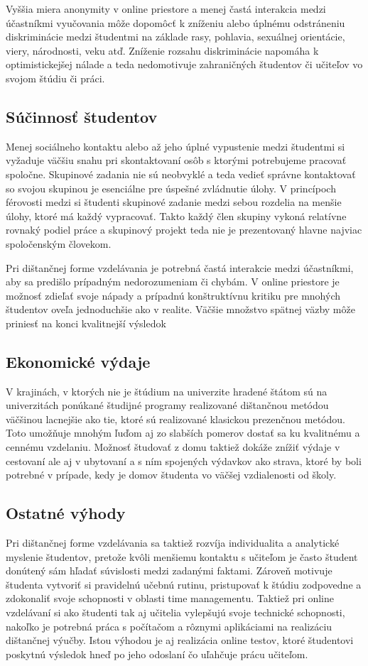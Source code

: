 \documentclass[10pt,twoside,slovak,a4paper]{article}
\begin{document}
 	Vyššia miera anonymity v online priestore a menej častá interakcia medzi účastníkmi vyučovania môže dopomôcť k zníženiu alebo úplnému odstráneniu diskriminácie medzi študentmi na základe rasy, pohlavia, sexuálnej orientácie, viery, národnosti, veku atď. Zníženie rozsahu diskriminácie napomáha k optimistickejšej nálade a teda nedomotivuje zahraničných študentov či učiteľov vo svojom štúdiu či práci.

\subsection{Súčinnosť študentov}
	Menej sociálneho kontaktu alebo až jeho úplné vypustenie medzi študentmi si vyžaduje väčšiu snahu pri skontaktovaní osôb s ktorými potrebujeme pracovať spoločne. Skupinové zadania nie sú neobvyklé a teda vedieť správne kontaktovať so svojou skupinou je esenciálne pre úspešné zvládnutie úlohy. V princípoch férovosti medzi  si študenti skupinové zadanie medzi sebou rozdelia na menšie úlohy, ktoré má každý vypracovať. Takto každý člen skupiny vykoná relatívne rovnaký podiel práce a skupinový projekt teda nie je prezentovaný hlavne najviac spoločenským človekom. 

	Pri dištančnej forme vzdelávania je potrebná častá interakcie medzi účastníkmi, aby sa predišlo prípadným nedorozumeniam či chybám. V online priestore je možnosť zdieľať svoje nápady a prípadnú konštruktívnu kritiku pre mnohých študentov oveľa jednoduchšie ako v realite. Väčšie množstvo spätnej väzby môže priniesť na konci kvalitnejší výsledok

\subsection{Ekonomické výdaje}
	V krajinách, v ktorých nie je štúdium na univerzite hradené štátom sú na univerzitách ponúkané študijné programy realizované dištančnou metódou väčšinou lacnejšie ako tie, ktoré sú realizované klasickou prezenčnou metódou. Toto umožňuje mnohým ľuďom aj zo slabších pomerov dostať sa ku kvalitnému a cennému vzdelaniu. Možnosť študovať z domu taktiež dokáže znížiť výdaje v cestovaní ale aj v ubytovaní a s ním spojených výdavkov ako strava, ktoré by boli potrebné v prípade, kedy je domov študenta vo väčšej vzdialenosti od školy. 

\subsection{Ostatné výhody}
	Pri dištančnej forme vzdelávania sa taktiež rozvíja individualita a analytické myslenie študentov, pretože kvôli menšiemu kontaktu s učiteľom je často študent donútený sám hľadať súvislosti medzi zadanými faktami. Zároveň motivuje študenta vytvoriť si pravidelnú učebnú rutinu, pristupovať k štúdiu zodpovedne a zdokonaliť svoje schopnosti v oblasti time managementu. Taktiež pri online vzdelávaní si ako študenti tak aj učitelia vylepšujú svoje technické schopnosti, nakoľko je potrebná práca s počítačom a rôznymi aplikáciami na realizáciu dištančnej výučby. Istou výhodou je aj realizácia online testov, ktoré študentovi poskytnú výsledok hneď po jeho odoslaní čo uľahčuje prácu učiteľom. 
\end{document}
